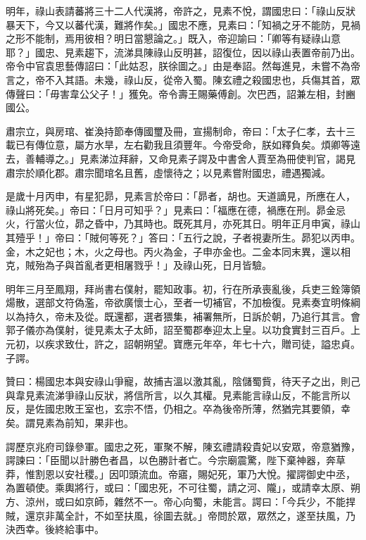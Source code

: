 \begin{pinyinscope}
 明年，祿山表請蕃將三十二人代漢將，帝許之，見素不悅，謂國忠曰：「祿山反狀暴天下，今又以蕃代漢，難將作矣。」國忠不應，見素曰：「知禍之牙不能防，見禍之形不能制，焉用彼相？明日當懇論之。」既入，帝迎諭曰：「卿等有疑祿山意耶？」國忠、見素趨下，流涕具陳祿山反明甚，詔復位，因以祿山表置帝前乃出。帝令中官袁思藝傳詔曰：「此姑忍，朕徐圖之。」由是奉詔。然每進見，未嘗不為帝言之，帝不入其語。未幾，祿山反，從帝入蜀。陳玄禮之殺國忠也，兵傷其首，眾傳聲曰：「毋害韋公父子！」獲免。帝令壽王賜藥傅創。次巴西，詔兼左相，封豳國公。



 肅宗立，與房琯、崔渙持節奉傳國璽及冊，宣揚制命，帝曰：「太子仁孝，去十三載已有傳位意，屬方水旱，左右勸我且須豐年。今帝受命，朕如釋負矣。煩卿等遠去，善輔導之。」見素涕泣拜辭，又命見素子諤及中書舍人賈至為冊使判官，謁見肅宗於順化郡。肅宗聞琯名且舊，虛懷待之；以見素嘗附國忠，禮遇獨減。



 是歲十月丙申，有星犯昴，見素言於帝曰：「昴者，胡也。天道謫見，所應在人，祿山將死矣。」帝曰：「日月可知乎？」見素曰：「福應在德，禍應在刑。昴金忌火，行當火位，昴之昏中，乃其時也。既死其月，亦死其日。明年正月申寅，祿山其殪乎！」帝曰：「賊何等死？」答曰：「五行之說，子者視妻所生。昴犯以丙申。金，木之妃也；木，火之母也。丙火為金，子申亦金也。二金本同末異，還以相克，賊殆為子與首亂者更相屠戮乎！」及祿山死，日月皆驗。



 明年三月至鳳翔，拜尚書右僕射，罷知政事。初，行在所承喪亂後，兵吏三銓簿領煬散，選部文符偽濫，帝欲廣懷士心，至者一切補官，不加檢復。見素奏宜明條綱以為持久，帝未及從。既還都，選者猥集，補署無所，日訴於朝，乃追行其言。會郭子儀亦為僕射，徙見素太子太師，詔至蜀郡奉迎太上皇。以功食實封三百戶。上元初，以疾求致仕，許之，詔朝朔望。寶應元年卒，年七十六，贈司徒，謚忠貞。子諤。



 贊曰：楊國忠本與安祿山爭寵，故捕吉溫以激其亂，陰儲蜀貲，待天子之出，則己與韋見素流涕爭祿山反狀，將信所言，以久其權。見素能言祿山反，不能言所以反，是佐國忠敗王室也，玄宗不悟，仍相之。卒為後帝所薄，然猶完其要領，幸矣。謂見素為前知，果非也。



 諤歷京兆府司錄參軍。國忠之死，軍聚不解，陳玄禮請殺貴妃以安眾，帝意猶豫，諤諫曰：「臣聞以計勝色者昌，以色勝計者亡。今宗廟震驚，陛下棄神器，奔草莽，惟割恩以安社稷。」因叩頭流血。帝寤，賜妃死，軍乃大悅。擢諤御史中丞，為置頓使。乘輿將行，或曰：「國忠死，不可往蜀，請之河、隴」，或請幸太原、朔方、涼州，或曰如京師，雜然不一。帝心向蜀，未能言。諤曰：「今兵少，不能捍賊，還京非萬全計，不如至扶風，徐圖去就。」帝問於眾，眾然之，遂至扶風，乃決西幸。後終給事中。




\end{pinyinscope}
